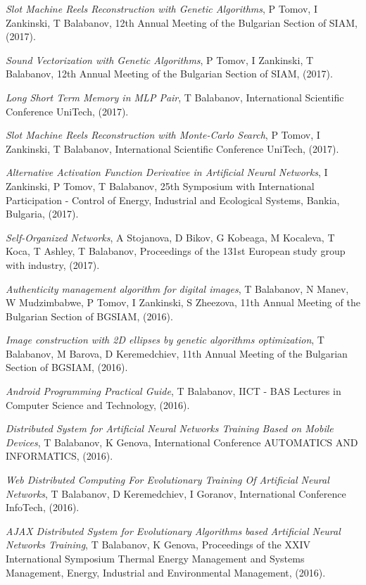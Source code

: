 \documentclass[english,a4paper]{europasscv}
\begin{document}
\begin{europasscv}
{\begin{ecvitemize}
    \item \textit{Slot Machine Reels Reconstruction with Genetic Algorithms}, P Tomov, I Zankinski, T Balabanov, 12th Annual Meeting of the Bulgarian Section of SIAM, (2017).
    \item \textit{Sound Vectorization with Genetic Algorithms}, P Tomov, I Zankinski, T Balabanov, 12th Annual Meeting of the Bulgarian Section of SIAM, (2017).
    \item \textit{Long Short Term Memory in MLP Pair}, T Balabanov, International Scientific Conference UniTech, (2017).
    \item \textit{Slot Machine Reels Reconstruction with Monte-Carlo Search}, P Tomov, I Zankinski, T Balabanov, International Scientific Conference UniTech, (2017).
    \item \textit{Alternative Activation Function Derivative in Artificial Neural Networks}, I Zankinski, P Tomov, T Balabanov, 25th Symposium with International Participation - Control of Energy, Industrial and Ecological Systems, Bankia, Bulgaria, (2017).
    \item \textit{Self-Organized Networks}, A Stojanova, D Bikov, G Kobeaga, M Kocaleva, T Koca, T Ashley, T Balabanov, Proceedings of the 131st European study group with industry, (2017).
    \item \textit{Authenticity management algorithm for digital images}, T Balabanov, N Manev, W Mudzimbabwe, P Tomov, I Zankinski, S Zheezova, 11th Annual Meeting of the Bulgarian Section of BGSIAM, (2016).
    \item \textit{Image construction with 2D ellipses by genetic algorithms optimization}, T Balabanov, M Barova, D Keremedchiev, 11th Annual Meeting of the Bulgarian Section of BGSIAM, (2016).
    \item \textit{Android Programming Practical Guide}, T Balabanov, IICT - BAS Lectures in Computer Science and Technology, (2016).
    \item \textit{Distributed System for Artificial Neural Networks Training Based on Mobile Devices}, T Balabanov, K Genova, International Conference AUTOMATICS AND INFORMATICS, (2016).
    \item \textit{Web Distributed Computing For Evolutionary Training Of Artificial Neural Networks}, T Balabanov, D Keremedchiev, I Goranov, International Conference InfoTech, (2016).
    \item \textit{AJAX Distributed System for Evolutionary Algorithms based Artificial Neural Networks Training}, T Balabanov, K Genova, Proceedings of the XXIV International Symposium Thermal Energy Management and Systems Management, Energy, Industrial and Environmental Management, (2016).

\end{ecvitemize}}
\end{europasscv}
\end{document}
